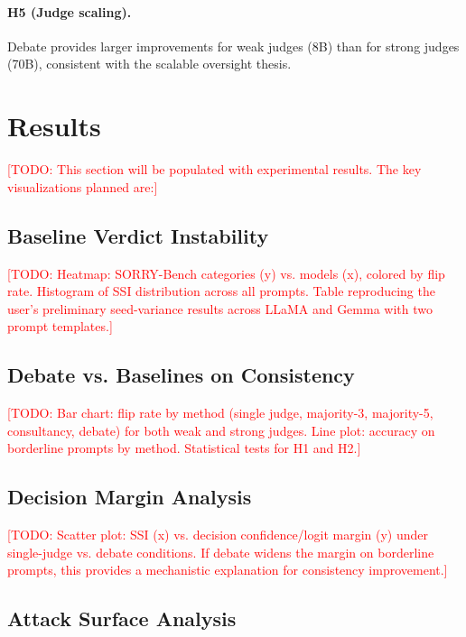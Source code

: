 \documentclass[preprint]{article}
\newcommand{\todo}[1]{\textcolor{red}{[TODO: #1]}}
\begin{document}
\paragraph{H5 (Judge scaling).} Debate provides larger improvements for weak judges (8B) than for strong judges (70B), consistent with the scalable oversight thesis.

\section{Results}
\label{sec:results}

\todo{This section will be populated with experimental results. The key visualizations planned are:}

\subsection{Baseline Verdict Instability}

\todo{Heatmap: SORRY-Bench categories (y) vs. models (x), colored by flip rate. Histogram of SSI distribution across all prompts. Table reproducing the user's preliminary seed-variance results across LLaMA and Gemma with two prompt templates.}

\subsection{Debate vs. Baselines on Consistency}

\todo{Bar chart: flip rate by method (single judge, majority-3, majority-5, consultancy, debate) for both weak and strong judges. Line plot: accuracy on borderline prompts by method. Statistical tests for H1 and H2.}

\subsection{Decision Margin Analysis}

\todo{Scatter plot: SSI (x) vs. decision confidence/logit margin (y) under single-judge vs. debate conditions. If debate widens the margin on borderline prompts, this provides a mechanistic explanation for consistency improvement.}

\subsection{Attack Surface Analysis}
\end{document}
